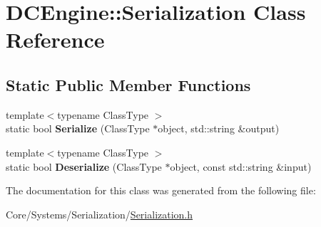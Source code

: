 \hypertarget{classDCEngine_1_1Serialization}{\section{D\-C\-Engine\-:\-:Serialization Class Reference}
\label{classDCEngine_1_1Serialization}
}
\subsection*{Static Public Member Functions}
\begin{DoxyCompactItemize}
\item 
\hypertarget{classDCEngine_1_1Serialization_a2853f04321603778a08d8c247e036a78}{{\footnotesize template$<$typename Class\-Type $>$ }\\static bool {\bfseries Serialize} (Class\-Type $\ast$object, std\-::string \&output)}\label{classDCEngine_1_1Serialization_a2853f04321603778a08d8c247e036a78}

\item 
\hypertarget{classDCEngine_1_1Serialization_a84bcb8534e6fea19b612cbc96d315c58}{{\footnotesize template$<$typename Class\-Type $>$ }\\static bool {\bfseries Deserialize} (Class\-Type $\ast$object, const std\-::string \&input)}\label{classDCEngine_1_1Serialization_a84bcb8534e6fea19b612cbc96d315c58}

\end{DoxyCompactItemize}


The documentation for this class was generated from the following file\-:\begin{DoxyCompactItemize}
\item 
Core/\-Systems/\-Serialization/\hyperlink{Serialization_8h}{Serialization.\-h}\end{DoxyCompactItemize}
